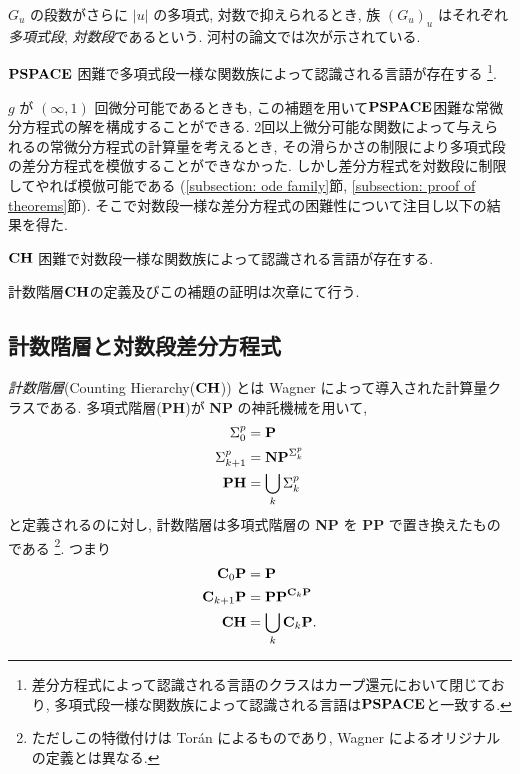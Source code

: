 $G_u$ の段数がさらに $|u|$ の多項式, 対数で抑えられるとき, 
族 $(G_u) _u$ はそれぞれ\emph{多項式段}, \emph{対数段}であるという. 
河村の論文では次が示されている.
\begin{lemma}
 \label{DIVPpolyIsPSPACEhard}
 $\mathbf{PSPACE}$ 困難で多項式段一様な関数族によって認識される言語が存在する
 \footnote{差分方程式によって認識される言語のクラスはカープ還元において閉じており,
多項式段一様な関数族によって認識される言語は$\mathbf{PSPACE}$と一致する.}.
\end{lemma}
$g$ が $(\infty, 1)$ 回微分可能であるときも,
この補題を用いて$\mathbf{PSPACE}$困難な常微分方程式の解を構成することができる.
2回以上微分可能な関数によって与えられるの常微分方程式の計算量を考えるとき,
その滑らかさの制限により多項式段の差分方程式を模倣することができなかった.
しかし差分方程式を対数段に制限してやれば模倣可能である
(\ref{subsection: ode family}節, \ref{subsection: proof of theorems}節).
そこで対数段一様な差分方程式の困難性について注目し以下の結果を得た.
\begin{lemma}
 \label{DIVPlogIsCHhard}
 $\mathbf{CH}$ 困難で対数段一様な関数族によって認識される言語が存在する.
\end{lemma}
計数階層$\mathbf{CH}$の定義及びこの補題の証明は次章にて行う.

\subsection{計数階層と対数段差分方程式}
\label{subsection: counting hierarchy}

\emph{計数階層}(Counting Hierarchy($\mathbf{CH}$)) とは
Wagner によって導入された計算量クラスである\cite{wagner1986complexity}.
多項式階層({\bf PH})が {\bf NP} の神託機械を用いて,
\begin{align*}
 \Sigma^p_0  &= \mathbf{P}
 \\
 \Sigma^p_{k+1} &= \mathbf{NP}^{\Sigma^p_k}
 \\
 \mathbf{PH} &= \bigcup_k \Sigma^p_k
\end{align*}
と定義されるのに対し,
計数階層は多項式階層の {\bf NP} を {\bf PP} で置き換えたものである
\footnote{ただしこの特徴付けは Tor{\'a}n によるものであり,
Wagner によるオリジナルの定義とは異なる\cite{toran1991complexity}.
}. つまり
\begin{align*}
 \mathbf{C}_0 \mathbf{P}  &= \mathbf{P}
 \\
 \mathbf{C}_{k+1} \mathbf{P} &= \mathbf{PP}^{\mathbf{C}_k \mathbf{P}}
 \\
 \mathbf{CH} &= \bigcup_k \mathbf{C}_k \mathbf{P}.
\end{align*}

